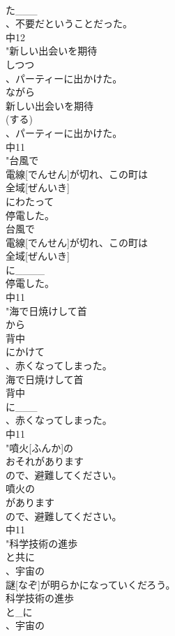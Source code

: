 \documentclass[8pt]{extreport}
\begin{document}
\begin{CJK}{UTF8}{min}
\\	た___
\\	、不要だということだった。
\\	中12
\\	"新しい出会いを期待
\\	しつつ
\\	、パーティーに出かけた。
\\	ながら	
\\	新しい出会いを期待
\\	(する)
\\	、パーティーに出かけた。
\\	中11
\\	"台風で
\\	電線[でんせん]が切れ、この町は
\\	全域[ぜんいき]
\\	にわたって
\\	停電した。
\\	台風で
\\	電線[でんせん]が切れ、この町は
\\	全域[ぜんいき]
\\	に____
\\	停電した。
\\	中11
\\	"海で日焼けして首
\\	から
\\	背中
\\	にかけて
\\	、赤くなってしまった。
\\	海で日焼けして首
\\	背中
\\	に___
\\	、赤くなってしまった。
\\	中11
\\	"噴火[ふんか]の
\\	おそれがあります
\\	ので、避難してください。
\\	噴火の
\\	があります
\\	ので、避難してください。
\\	中11
\\	"科学技術の進歩
\\	と共に
\\	、宇宙の
\\	謎[なぞ]が明らかになっていくだろう。
\\	科学技術の進歩
\\	と_に
\\	、宇宙の

\end{CJK}
\end{document}
